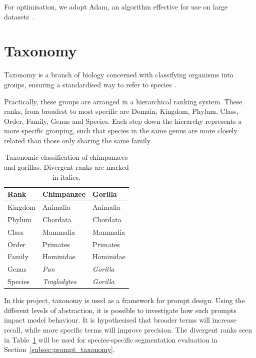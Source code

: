 \documentclass[author={Jacob Stephenson},
    degree={BSc},
    title={Robust Great Ape Species Detection in Wild Camera Trap Imagery with Promptable Concept Segmentation},
    unit={COMS30045},
    subtitle={}]{dissertation}
\begin{document}
For optimisation, we adopt Adam, an algorithm effective for use on large datasets~\cite{kingma2017adammethodstochasticoptimization}.



\section{Taxonomy}

Taxonomy is a branch of biology concerned with classifying organisms into groups, ensuring a standardised way to refer to species \cite{britannica_taxonomy, nhm_taxonomy}.

Practically, these groups are arranged in a hierarchical ranking system. These ranks, from broadest to most specific are Domain, Kingdom, Phylum, Class, Order, Family, Genus and Species. Each step down the hierarchy represents a more specific grouping, such that species in the same genus are more closely related than those only sharing the same family.

\begin{table}[h]
    \centering
    \begin{tabular}{l|ll}
        \toprule
        \textbf{Rank} & \textbf{Chimpanzee} & \textbf{Gorilla} \\
        \midrule
        Kingdom & Animalia & Animalia \\
        Phylum & Chordata & Chordata \\
        Class & Mammalia & Mammalia \\
        Order & Primates & Primates \\
        Family & Hominidae & Hominidae \\
        \midrule
        Genus & \textit{Pan} & \textit{Gorilla} \\
        Species & \textit{Troglodytes} & \textit{Gorilla} \\
        \bottomrule
    \end{tabular}
    \caption[Chimpanzee and Gorilla Taxonomy]{Taxonomic classification of chimpanzees and gorillas. Divergent ranks are marked in italics.}
    \label{tab:taxonomy}
\end{table}

In this project, taxonomy is used as a framework for prompt design. Using the different levels of abstraction, it is possible to investigate how such prompts impact model behaviour. It is hypothesised that broader terms will increase recall, while more specific terms will improve precision. The divergent ranks seen in Table~\ref{tab:taxonomy} will be used for species-specific segmentation evaluation in Section~\ref{subsec:prompt_taxonomy}.
\end{document}
